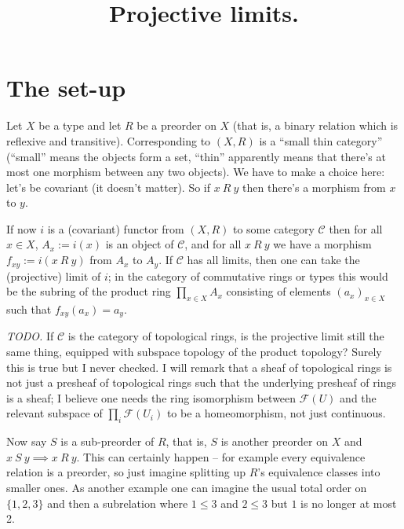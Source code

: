 \documentclass{amsart}
\theoremstyle{plain}
\theoremstyle{remark}
\begin{document}
\title{Projective limits.}
\maketitle

\section{The set-up}

Let $X$ be a type and let $R$ be a preorder on $X$ (that is, a binary relation which is reflexive and transitive). Corresponding to $(X,R)$ is a ``small thin category'' (``small'' means the objects form a set, ``thin'' apparently means that there's at most one morphism between any two objects). We have to make a choice here: let's be covariant (it doesn't matter). So if $x\ R\ y$ then there's a morphism from $x$ to $y$.

If now $i$ is a (covariant) functor from $(X,R)$ to some category $\mathcal{C}$ then for all $x\in X$, $A_x:=i(x)$ is an object of $\mathcal{C}$, and for all $x\ R\ y$ we have a morphism $f_{xy}:=i(x\ R\ y)$ from $A_x$ to $A_y$. If $\mathcal{C}$ has all limits, then one can take the (projective) limit of $i$; in the category of commutative rings or types this would be the subring of the product ring $\prod_{x\in X}A_x$ consisting of elements $(a_x)_{x\in X}$ such that $f_{xy}(a_x)=a_y$.

{\it TODO.} If $\mathcal{C}$ is the category of topological rings, is the projective limit still the same thing, equipped with subspace topology of the product topology? Surely this is true but I never checked. I will remark that a sheaf of topological rings is not just a presheaf of topological rings such that the underlying presheaf of rings is a sheaf; I believe one needs the ring isomorphism between $\mathcal{F}(U)$ and the relevant subspace of $\prod_i\mathcal{F}(U_i)$ to be a homeomorphism, not just continuous.

Now say $S$ is a sub-preorder of $R$, that is, $S$ is another preorder on $X$ and $x\ S\ y\implies x\ R\ y$. This can certainly happen -- for example every equivalence relation is a preorder, so just imagine splitting up $R$'s equivalence classes into smaller ones. As another example one can imagine the usual total order on $\{1,2,3\}$ and then a subrelation where $1\leq 3$ and $2\leq 3$ but $1$ is no longer at most 2.
\end{document}
